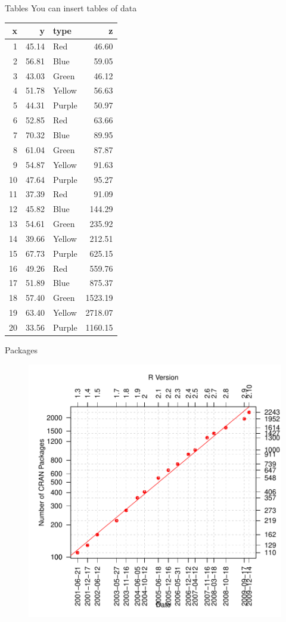 \documentclass[final,t]{beamer}
\begin{document}
\begin{frame}{}
\begin{columns}[t]
\begin{column}{0.32\linewidth}
      \begin{block}{Tables}
        You can insert tables of data
        \\
\begin{tabular}{rrlr}
  \hline
x & y & type & z \\ 
  \hline
  1 & 45.14 & Red & 46.60 \\ 
    2 & 56.81 & Blue & 59.05 \\ 
    3 & 43.03 & Green & 46.12 \\ 
    4 & 51.78 & Yellow & 56.63 \\ 
    5 & 44.31 & Purple & 50.97 \\ 
    6 & 52.85 & Red & 63.66 \\ 
    7 & 70.32 & Blue & 89.95 \\ 
    8 & 61.04 & Green & 87.87 \\ 
    9 & 54.87 & Yellow & 91.63 \\ 
   10 & 47.64 & Purple & 95.27 \\ 
   11 & 37.39 & Red & 91.09 \\ 
   12 & 45.82 & Blue & 144.29 \\ 
   13 & 54.61 & Green & 235.92 \\ 
   14 & 39.66 & Yellow & 212.51 \\ 
   15 & 67.73 & Purple & 625.15 \\ 
   16 & 49.26 & Red & 559.76 \\ 
   17 & 51.89 & Blue & 875.37 \\ 
   18 & 57.40 & Green & 1523.19 \\ 
   19 & 63.40 & Yellow & 2718.07 \\ 
   20 & 33.56 & Purple & 1160.15 \\ 
   \hline
\end{tabular}      \end{block}

      \begin{block}{Packages}
\begin{figure}[htb]
        \includegraphics[width=.4\columnwidth]{beamerpostertest-pack}
        \end{figure}
\end{block}


\end{column}
\end{columns}
\end{frame}
\end{document}
